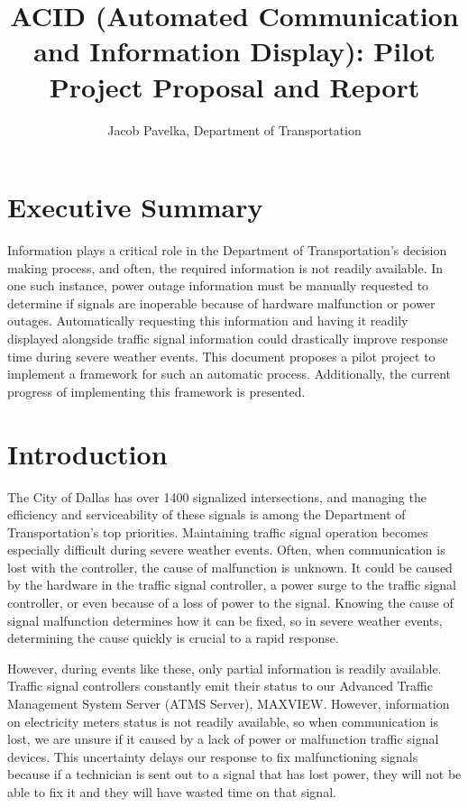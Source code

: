 \documentclass[letterpaper, notitlepage]{report}
\title{ACID (Automated Communication and Information Display): Pilot Project Proposal and Report}
\author{Jacob Pavelka, Department of Transportation}
\begin{document}
\maketitle

\section{Executive Summary}

Information plays a critical role in the Department of Transportation's decision making process, and often, the required information is not readily available. In one such instance, power outage information must be manually requested to determine if signals are inoperable because of hardware malfunction or power outages. Automatically requesting this information and having it readily displayed alongside traffic signal information could drastically improve response time during severe weather events. This document proposes a pilot project to implement a framework for such an automatic process. Additionally, the current progress of implementing this framework is presented. 

\section{Introduction}

The City of Dallas has over 1400 signalized intersections, and managing the efficiency and serviceability of these signals is among the Department of Transportation's top priorities. Maintaining traffic signal operation becomes especially difficult during severe weather events. Often, when communication is lost with the controller, the cause of malfunction is unknown. It could be caused by the hardware in the traffic signal controller, a power surge to the traffic signal controller, or even because of a loss of power to the signal. Knowing the cause of signal malfunction determines how it can be fixed, so in severe weather events, determining the cause quickly is crucial to a rapid response. 

However, during events like these, only partial information is readily available. Traffic signal controllers constantly emit their status to our Advanced Traffic Management System Server (ATMS Server), MAXVIEW. However, information on electricity meters status is not readily available, so when communication is lost, we are unsure if it caused by a lack of power or malfunction traffic signal devices. This uncertainty delays our response to fix malfunctioning signals because if a technician is sent out to a signal that has lost power, they will not be able to fix it and they will have wasted time on that signal.
\end{document}
